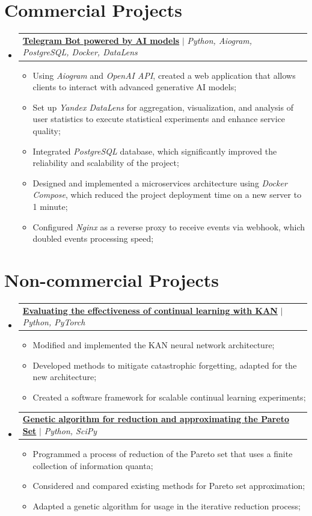 \documentclass[a4paper, 11pt]{article}
\makeatletter
\newcommand{\resumeItem}[1]{
  \item\small{
    {#1 \vspace{-2pt}}
  }
}
\newcommand{\resumeProjectHeading}[2]{
    \item
    \begin{tabular*}{0.97\textwidth}{l@{\extracolsep{\fill}}r}
      \small#1 & #2 \\
    \end{tabular*}\vspace{-6pt}
}
\newcommand{\resumeSubHeadingListStart}{\begin{itemize}[leftmargin=0.15in, label={}]}
\newcommand{\resumeSubHeadingListEnd}{\end{itemize}}
\newcommand{\resumeItemListStart}{\begin{itemize}}
\newcommand{\resumeItemListEnd}{\end{itemize}\vspace{-5pt}}
\makeatother
\begin{document}
\section{Commercial Projects}
    \resumeSubHeadingListStart
      \resumeProjectHeading
          {\href{https://github.com/trxxxxkov/chxxxxbot.git}{\textbf{Telegram Bot powered by AI models}} $|$ \emph{Python, Aiogram, PostgreSQL, Docker, DataLens}}{}
          \resumeItemListStart
            \resumeItem{Using \emph{Aiogram} and \emph{OpenAI API},  created a web application that allows clients to interact with advanced generative AI models;}
            \resumeItem{Set up \emph{Yandex DataLens} for aggregation, visualization, and analysis of user statistics to execute statistical experiments and enhance service quality;}
            \resumeItem{Integrated \emph{PostgreSQL} database, which significantly improved the reliability and scalability of the project;}
            \resumeItem{Designed and implemented a microservices architecture using \emph{Docker Compose}, which reduced the project deployment time on a new server to 1 minute;}
            \resumeItem{Configured \emph{Nginx} as a reverse proxy to receive events via webhook, which doubled events processing speed;}
          \resumeItemListEnd
    \resumeSubHeadingListEnd


\section{Non-commercial Projects}

    \resumeSubHeadingListStart

        \resumeProjectHeading
            {\href{https://github.com/trxxxxkov/spbu-bachelor-thesis}{\textbf{Evaluating the effectiveness of continual learning with KAN}} \(|\) \emph{Python, PyTorch}}{}
            \resumeItemListStart
                \resumeItem{Modified and implemented the KAN neural network architecture;}
                \resumeItem{Developed methods to mitigate catastrophic forgetting, adapted for the new architecture;}
                \resumeItem{Created a software framework for scalable continual learning experiments;}
        \resumeItemListEnd
    

    
        \resumeProjectHeading
            {\href{https://github.com/trxxxxkov/approxer}{\textbf{Genetic algorithm for reduction and approximating the Pareto Set}} \(|\) \emph{Python, SciPy}}{}
            \resumeItemListStart
                \resumeItem{Programmed a process of reduction of the Pareto set that uses a finite collection of information quanta;}
                \resumeItem{Considered and compared existing methods for Pareto set approximation;}
                \resumeItem{Adapted a genetic algorithm for usage in the iterative reduction process;}
          \resumeItemListEnd
        \resumeSubHeadingListEnd
\end{document}
